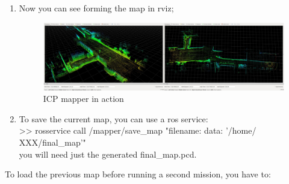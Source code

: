 \documentclass[a4paper,12pt]{article}
\newcommand{\grayhl}[1]{{\fontfamily{cmss}\selectfont  \colorbox{gray!30}{>> #1}}}
\begin{document}
\begin{enumerate}
    \item Now you can see forming the map in rviz;
    \begin{figure}[H]
        \centering
        \includegraphics[width=\textwidth]{img/rviz1.png}
        \caption{ICP mapper in action}
        \label{fig:rviz1}
    \end{figure}
    \item To save the current map, you can use a ros service:\\
    \grayhl{rosservice call /mapper/save\_map "filename: data: '/home/ XXX/final\_map'" }\\
    you will need just the generated final\_map.pcd.
\end{enumerate}
\newpage
To load the previous map before running a second mission, you have to:
\end{document}
